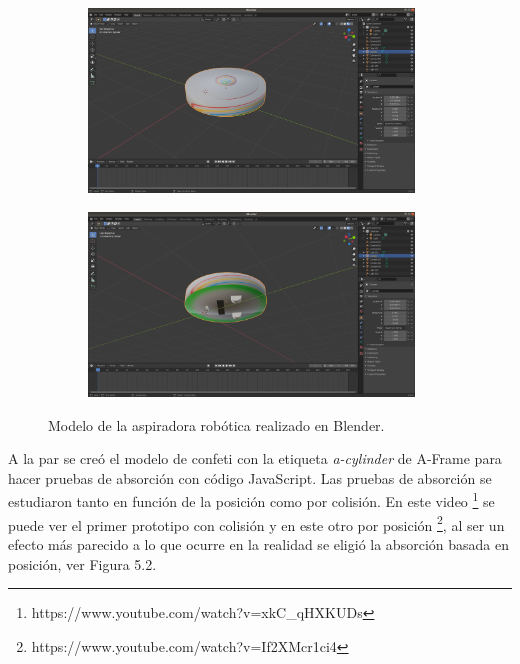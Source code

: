  \begin{figure}[H]
  \begin{subfigure}[b]{0.5\textwidth}
  \centering
    \includegraphics[width=0.95\textwidth, height=0.7\textwidth]{chapters/images/roombablender.png}
    \caption{}
    \label{fig:f1}
  \end{subfigure}
  \hfill
  \begin{subfigure}[b]{0.5\textwidth}
  \centering
    \includegraphics[width=0.95\textwidth, height=0.7\textwidth]{chapters/images/roombablender2.png}
	\caption{}    
    \label{fig:f2}
 
  \end{subfigure}
  \caption{Modelo de la aspiradora robótica  realizado en Blender.}
\end{figure}

A la par se creó el modelo de confeti con la etiqueta \textit{a-cylinder} de A-Frame para hacer pruebas de absorción con código JavaScript.
Las pruebas de absorción se estudiaron tanto en función de la posición como por colisión. En este video \footnote{https://www.youtube.com/watch?v=xkC\_qHXKUDs} se puede ver el primer prototipo con colisión y en este otro  por posición \footnote{https://www.youtube.com/watch?v=If2XMcr1ci4}, al ser un efecto más parecido a lo que ocurre en la realidad se eligió la absorción basada en posición, ver Figura 5.2.

